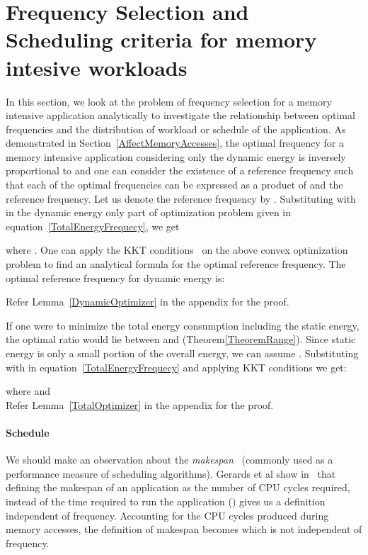 \documentclass[11pt, letterpaper]{article}
\begin{document}
\section{Frequency Selection and Scheduling criteria for memory intesive workloads}\label{SelectionScheduling}
In this section, we look at the problem of frequency selection for a memory intensive application analytically to investigate the relationship between optimal frequencies and the distribution of workload or schedule of the application. As demonstrated in Section~\ref{AffectMemoryAccesses}, the optimal frequency  for a memory intensive application considering only the dynamic energy is inversely proportional to  and one can consider the existence of a reference frequency such that each of the optimal frequencies can be expressed as a product of  and the reference frequency. Let us denote the reference frequency by . Substituting  with  in the dynamic energy only part of optimization problem given in equation~\ref{TotalEnergyFrequecy}, we get



where  .
One can apply the KKT conditions~\cite{Boyd} on the above convex optimization problem to find an analytical formula for the optimal reference frequency. The optimal reference frequency for dynamic energy is:

Refer Lemma~\ref{DynamicOptimizer} in the appendix for the proof.

If one were to minimize the total energy consumption including the static energy, the optimal ratio  would lie between  and  (Theorem\ref{TheoremRange}). Since static energy is only a small portion of the overall energy, we can assume . Substituting   with  in equation~\ref{TotalEnergyFrequecy} and applying KKT conditions we get:

where  and \\

 Refer Lemma~\ref{TotalOptimizer} in the appendix for the proof.
 
\paragraph{Schedule}
We should make an observation about the \emph{makespan}~\cite{Brucker} (commonly used as a performance measure of scheduling algorithms). Gerards et al show in~\cite{ConvexAndScheduling} that defining the makespan of an application as the number of CPU cycles required, instead of the time required to run the application ()  gives us a definition independent of frequency. Accounting for the CPU cycles produced during memory accesses, the definition of makespan becomes  which is not independent of frequency.
\end{document}
